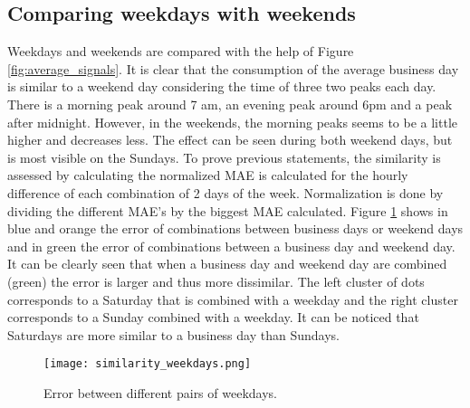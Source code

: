 \subsection{Comparing weekdays with weekends} \label{s:Comparing weekdays with weekends}
Weekdays and weekends are compared with the help of Figure \ref{fig:average_signals}. It is clear that the consumption of the average business day is similar to a weekend day considering the time of three two peaks each day. There is a morning peak around 7 am, an evening peak around 6pm and a peak after midnight. However, in the weekends, the morning peaks seems to be a little higher and decreases less. The effect can be seen during both weekend days, but is most visible on the Sundays. To prove previous statements, the similarity is assessed by calculating the normalized MAE is calculated for the hourly difference of each combination of 2 days of the week. Normalization is done by dividing the different MAE's by the biggest MAE calculated. Figure \ref{fig:similarity_weekdays} shows in blue and orange the error of combinations between business days or weekend days and in green the error of combinations between a business day and weekend day. It can be clearly seen that when a business day and weekend day are combined (green) the error is larger and thus more dissimilar. The left cluster of dots corresponds to a Saturday that is combined with a weekday and the right cluster corresponds to a Sunday combined with a weekday. It can be noticed that Saturdays are more similar to a business day than Sundays. 

\begin{figure}[h!]
	\centering
	\texttt{[image: similarity\_weekdays.png]}
	\caption{Error between different pairs of weekdays.}
	\label{fig:similarity_weekdays}
\end{figure}


